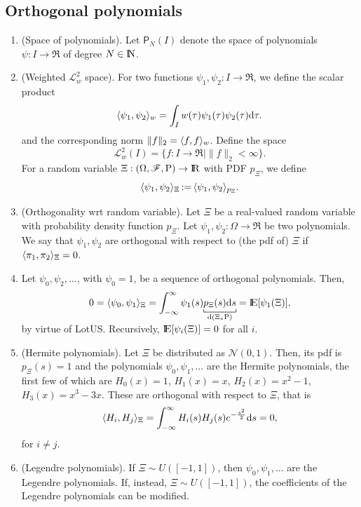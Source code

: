 \documentclass[a4paper,10pt]{scrbook}
\begin{document}
\subsection{Orthogonal polynomials}
\begin{enumerate}
 \item (Space of polynomials). Let \(\mathsf{P}_N(I)\) denote the space of polynomials \(\psi:I\to\Re\) of degree
       \(N\in\N\). 
 \item (Weighted \(\mathcal{L}^2_w\) space). For two functions \(\psi_1,\psi_2:I\to\Re\), we define the scalar product
       \[
        \langle\psi_1, \psi_2\rangle_{w} = \int_{I}w(\tau) \psi_1(\tau) \psi_2(\tau) \mathrm{d} \tau.
       \]
       and the corresponding norm \(\|f\|_2 = \langle f,f\rangle_w\). Define the space
       \[
        \mathcal{L}^2_w(I) = \{f:I\to\Re \mid \|f\|_2 < \infty\}.
       \]
       For a random variable \(\Xi:\ofp\to\Re\) with PDF \(p_\Xi\), we define 
       \[
        \langle\psi_1, \psi_2\rangle_{\Xi} {}{}\mathop{\mathrel{:}=}{}{} \langle\psi_1, \psi_2\rangle_{p_{\Xi}}.
       \]

 \item (Orthogonality wrt random variable). Let $\Xi$ be a real-valued random variable with 
       probability density function $p_\Xi$. Let \(\psi_1,\psi_2:\Omega\to\Re\) be two polynomials.        
       We say that \(\psi_1,\psi_2\) are orthogonal with respect to (the pdf of) \(\Xi\) if 
       \(\langle\pi_1, \pi_2\rangle_{\Xi} = 0\).
 \item Let \(\psi_0, \psi_2,\ldots\), with \(\psi_0=1\), be a sequence of orthogonal polynomials.
       Then,
       \[
        0 = \< \psi_0, \psi_1 \>_\Xi
          = \int_{-\infty}^{\infty} \psi_{1}(s) 
          \smashunderbracket{p_{\Xi}(s) \d s}{\d (\Xi_* \prob)}
          = \E[\psi_1(\Xi)],
       \]
       by virtue of LotUS. Recursively, \(\E[\psi_i(\Xi)] = 0\) for all \(i\).
       
 \item (Hermite polynomials). Let \(\Xi\) be distributed as \(\mathcal{N}(0,1)\).
       Then, its pdf is \(p_{\Xi}(s) = 1\) and the polynomials \(\psi_0,\psi_1,\ldots\) are the 
       Hermite polynomials, the first few of which are \(H_0(x)=1\), \(H_1(x)=x\), \(H_2(x)=x^2-1\),
       \(H_3(x) = x^3 - 3x\). These are orthogonal with respect to \(\Xi\), that is
       \[
        \langle H_i, H_j\rangle_\Xi = \int_{-\infty}^{\infty}H_i(s) H_j(s) e^{-\frac{s^2}{2}}\mathrm{d} s = 0,
       \]
       for \(i\neq j\).

       
 \item (Legendre polynomials). If \(\Xi\sim U([-1,1])\), then \(\psi_0,\psi_1,\ldots\) are the 
        Legendre polynomials. If, instead, \(\Xi\sim U([-1,1])\), the coefficients of the 
        Legendre polynomials can be modified.
        

\end{enumerate}
\end{document}
